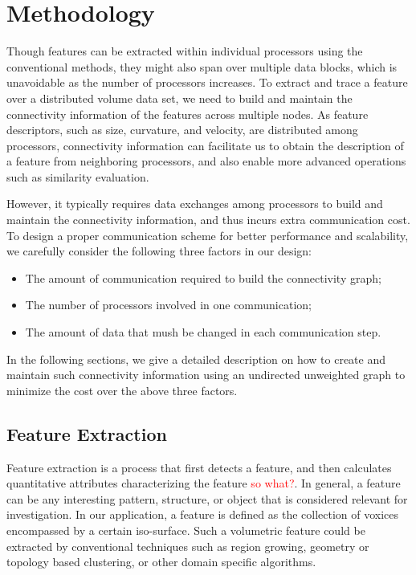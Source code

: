 \documentclass[10pt, conference, compsocconf]{IEEEtran}
\begin{document}
\section{Methodology}

Though features can be extracted within individual processors using the conventional methods, they might also span over multiple data blocks, which is unavoidable as the number of processors increases. To extract and trace a feature over a distributed volume data set, we need to build and maintain the connectivity information of the features across multiple nodes. As feature descriptors, such as size, curvature, and velocity, are distributed among processors, connectivity information can facilitate us to obtain the description of a feature from neighboring processors, and also enable more advanced operations such as similarity evaluation.

However, it typically requires data exchanges among processors to build and maintain the connectivity information, and thus incurs extra communication cost. To design a proper communication scheme for better performance and scalability, we carefully consider the following three factors in our design:

\begin{itemize}
\item The amount of communication required to build the connectivity graph;
\item The number of processors involved in one communication;
\item The amount of data that mush be changed in each communication step.
\end{itemize}

In the following sections, we give a detailed description on how to create and maintain such connectivity information using an undirected unweighted graph to minimize the cost over the above three factors.

\subsection{Feature Extraction}

Feature extraction is a process that first detects a feature, and then calculates quantitative attributes characterizing the feature \textcolor{red}{so what?}. In general, a feature can be any interesting pattern, structure, or object that is considered relevant for investigation. In our application, a feature is defined as the collection of voxices encompassed by a certain iso-surface. Such a volumetric feature could be extracted by conventional techniques such as region growing, geometry or topology based clustering, or other domain specific algorithms.
\end{document}
